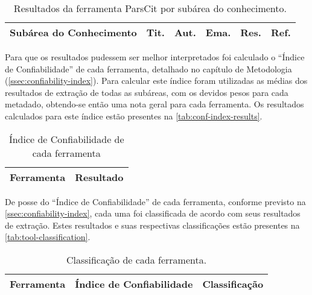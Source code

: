 \begin{table}[h!]
    \caption{Resultados da ferramenta ParsCit por subárea do conhecimento.}
    \begin{center}
        \begin{tabular}{|p{6cm}|C{1.2cm}|C{1.2cm}|C{1.2cm}|C{1.2cm}|C{1.2cm}|}
            \hline 
            \textbf{Subárea do Conhecimento} & \textbf{Tit.} & \textbf{Aut.} & \textbf{Ema.} & \textbf{Res.} & \textbf{Ref.} \\ \hline 
            
        \end{tabular}
    \end{center}
    \label{tab:results-parscit}
\end{table}


Para que os resultados pudessem ser melhor interpretados foi calculado o ``Índice de Confiabilidade'' de cada ferramenta, detalhado no capítulo de Metodologia (\autoref{ssec:confiability-index}). Para calcular este índice foram utilizadas as médias dos resultados de extração de todas as subáreas, com os devidos pesos para cada metadado, obtendo-se então uma nota geral para cada ferramenta. Os resultados calculados para este índice estão presentes na \autoref{tab:conf-index-results}.

\begin{table}[h!]
    \caption{Índice de Confiabilidade de cada ferramenta}
    \begin{center}
        \begin{tabular}{|p{3cm}|C{3cm}|}
            \hline 
            \textbf{Ferramenta} & \textbf{Resultado} \\ \hline 
            
        \end{tabular}
    \end{center}
    \label{tab:conf-index-results}
\end{table}

De posse do ``Índice de Confiabilidade'' de cada ferramenta, conforme previsto na \autoref{ssec:confiability-index}, cada uma foi classificada de acordo com seus resultados de extração. Estes resultados e suas respectivas classificações estão presentes na \autoref{tab:tool-classification}.

\begin{table}[h!]
    \caption{Classificação de cada ferramenta.}
    \begin{center}
        \begin{tabular}{|p{3cm}|C{5.5cm}|p{4cm}|}
            \hline 
            \textbf{Ferramenta} & \textbf{Índice de Confiabilidade} & \textbf{Classificação} \\ \hline 
            
        \end{tabular}
    \end{center}
    \label{tab:tool-classification}
\end{table}

